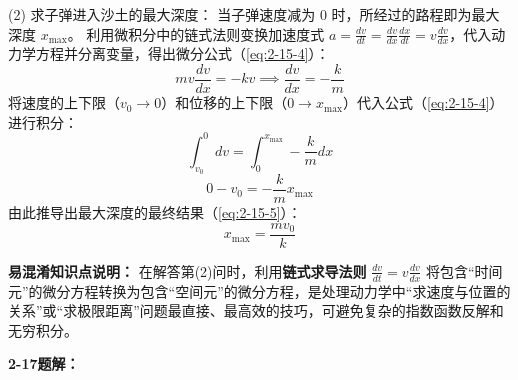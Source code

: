 (2) 求子弹进入沙土的最大深度：
当子弹速度减为 $0$ 时，所经过的路程即为最大深度 $x_{\text{max}}$。
利用微积分中的链式法则变换加速度式 $a = \frac{dv}{dt} = \frac{dv}{dx}\frac{dx}{dt} = v\frac{dv}{dx}$，代入动力学方程并分离变量，得出微分公式（\ref{eq:2-15-4}）：
\begin{equation}\label{eq:2-15-4}
	m v \frac{dv}{dx} = -kv \implies \frac{dv}{dx} = -\frac{k}{m}
\end{equation}
将速度的上下限（$v_0 \to 0$）和位移的上下限（$0 \to x_{\text{max}}$）代入公式（\ref{eq:2-15-4}）进行积分：
$$\int_{v_0}^{0} dv = \int_{0}^{x_{\text{max}}} -\frac{k}{m} dx$$
$$0 - v_0 = -\frac{k}{m} x_{\text{max}}$$
由此推导出最大深度的最终结果（\ref{eq:2-15-5}）：
\begin{equation}\label{eq:2-15-5}
	x_{\text{max}} = \frac{mv_0}{k}
\end{equation}

\textbf{易混淆知识点说明：}
在解答第(2)问时，利用\textbf{链式求导法则} $\frac{dv}{dt} = v\frac{dv}{dx}$ 将包含“时间元”的微分方程转换为包含“空间元”的微分方程，是处理动力学中“求速度与位置的关系”或“求极限距离”问题最直接、最高效的技巧，可避免复杂的指数函数反解和无穷积分。

\vspace{2em}

\textbf{2-17题解：}
\setcounter{equation}{0}
\renewcommand{\theHequation}{2-17.\arabic{equation}}

